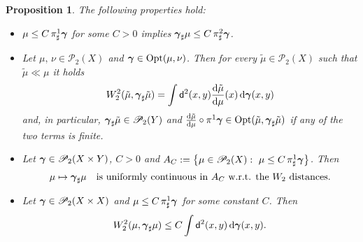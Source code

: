 \documentclass[reqno,11pt]{article}
\numberwithin{equation}{section}
\newcommand{\ggamma}{{\mbox{\boldmath$\gamma$}}}
\newcommand{\sfd}{{\sf d}}
\renewcommand{\d}{{\mathrm d}}
\newcommand{\ProbabilitiesTwo}[1]{\mathscr P_2(#1)}     %
\newtheorem{proposition}[theorem]{Proposition}
\newcommand{\probt}{\ProbabilitiesTwo}
\newcommand{\opt}[2]{{\rm{Opt}}(#1,#2)}
\begin{document}
\begin{proposition}\label{prop:basegammasharp}
The following properties hold:
\begin{itemize}
\item[(i)] $\mu\leq C\,\pi^1_\sharp\ggamma$ for some $C>0$ implies $\ggamma_\sharp\mu\leq C\,\pi^2_\sharp\ggamma$.
\item[(ii)] Let
  $\mu,\,\nu\in\probt X$ and $\ggamma\in\opt\mu\nu$. Then for every
$\tilde\mu\in\probt X$ such that $\tilde\mu\ll\mu$ it holds
\begin{equation}
\label{eq:optpush} W_2^2(\tilde\mu,\ggamma_\sharp\tilde\mu)=\int
\sfd^2(x,y)\frac{\d \tilde\mu}{\d\mu}(x)\,\d\ggamma(x,y)
\end{equation}
and, in particular, $\ggamma_\sharp\tilde\mu\in\probt{Y}$ and
$\frac{\d\tilde\mu}{\d\mu}\circ\pi^1\ggamma\in\opt{\tilde\mu}{\ggamma_\sharp\tilde\mu}$
if any of the two terms is finite.
\item[(iii)] Let $\ggamma\in\probt{X\times Y}$, $C>0$ and
$A_C:=\bigl\{\mu\in\probt X:\ \mu\leq C\,\pi^1_\sharp\ggamma\bigr\}$.
Then
\begin{equation}
\label{eq:uniforme} \mu\mapsto\ggamma_\sharp\mu \quad\text{is
uniformly continuous in $A_C$ w.r.t. the $W_2$ distances.}
\end{equation}
\item[(iv)] Let $\ggamma\in\probt{X\times X}$ and $\mu\leq C\,\pi^1_\sharp\ggamma$ for some constant $C$.
Then
\begin{equation}
\label{eq:boundlimitato}
W_2^2(\mu,\ggamma_\sharp\mu)\leq C\int\sfd^2(x,y)\,\d\ggamma(x,y).
\end{equation}
\end{itemize}
\end{proposition}
\end{document}
